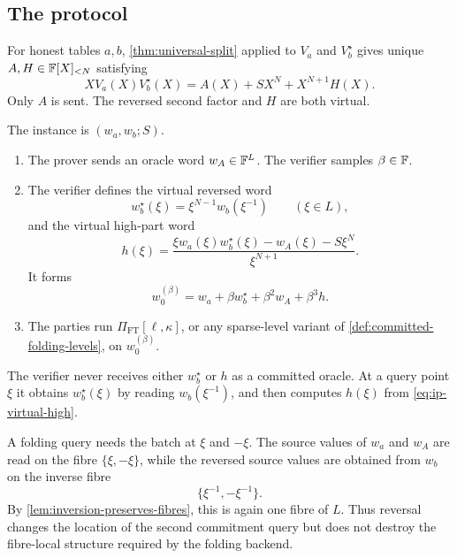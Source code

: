 \subsection{The protocol}
\label{sec:ip-protocol}

For honest tables $a,b$, \cref{thm:universal-split} applied to $V_a$ and $V_b^{\star}$ gives unique $A,H\in\mathbb{F}[X]_{<N}$ satisfying
\begin{equation}
  XV_a(X)V_b^{\star}(X)
  =A(X)+SX^N+X^{N+1}H(X).
  \label{eq:ip-opening-identity}
\end{equation}
Only $A$ is sent.  The reversed second factor and $H$ are both virtual.

\begin{definition}
\label{def:ip-protocol}
The instance is $(w_a,w_b;S)$.
\begin{enumerate}[label=\textnormal{\arabic*.},leftmargin=*]
  \item The prover sends an oracle word $w_A\in\mathbb{F}^L$.  The verifier samples $\beta\in\mathbb{F}$.
  \item The verifier defines the virtual reversed word
  \begin{equation}
    w_b^{\star}(\xi)
    =\xi^{N-1}w_b(\xi^{-1})
    \qquad(\xi\in L),
    \label{eq:ip-virtual-reversal}
  \end{equation}
  and the virtual high-part word
  \begin{equation}
    h(\xi)
    =\frac{\xi w_a(\xi)w_b^{\star}(\xi)-w_A(\xi)-S\xi^N}{\xi^{N+1}}.
    \label{eq:ip-virtual-high}
  \end{equation}
  It forms
  \begin{equation}
    w_0^{(\beta)}
    =w_a+\beta w_b^{\star}+\beta^2w_A+\beta^3h.
    \label{eq:ip-batch}
  \end{equation}
  \item The parties run $\Pi_{\mathrm{FT}}[\ell,\kappa]$, or any sparse-level variant of \cref{def:committed-folding-levels}, on $w_0^{(\beta)}$.
\end{enumerate}
The verifier never receives either $w_b^{\star}$ or $h$ as a committed oracle.  At a query point $\xi$ it obtains $w_b^{\star}(\xi)$ by reading $w_b(\xi^{-1})$, and then computes $h(\xi)$ from \eqref{eq:ip-virtual-high}.
\end{definition}

\begin{remark}
\label{rem:ip-fibre-locality}
A folding query needs the batch at $\xi$ and $-\xi$.  The source values of $w_a$ and $w_A$ are read on the fibre $\{\xi,-\xi\}$, while the reversed source values are obtained from $w_b$ on the inverse fibre
\[
  \{\xi^{-1},-\xi^{-1}\}.
\]
By \cref{lem:inversion-preserves-fibres}, this is again one fibre of $L$.  Thus reversal changes the location of the second commitment query but does not destroy the fibre-local structure required by the folding backend.
\end{remark}

